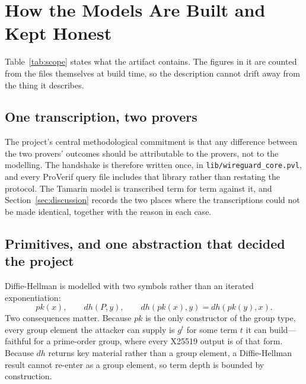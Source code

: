 \section{How the Models Are Built and Kept Honest}
\label{sec:modelling}

Table~\ref{tab:scope} states what the artifact contains. The figures in it are
counted from the files themselves at build time, so the description cannot
drift away from the thing it describes.

\begin{table}[t]
\centering
\caption{Verification scope, measured from the repository rather than
described. ``Properties'' counts rows of the result matrix
(Table~\ref{tab:results}), not queries: a model file may carry several.}
\label{tab:scope}
\footnotesize

\end{table}

\subsection{One transcription, two provers}

The project's central methodological commitment is that any difference between
the two provers' outcomes should be attributable to the provers, not to the
modelling. The handshake is therefore written once, in
\texttt{lib/wireguard\_core.pvl}, and every ProVerif query file includes that
library rather than restating the protocol. The Tamarin model is transcribed
term for term against it, and Section~\ref{sec:discussion} records the two
places where the transcriptions could not be made identical, together with the
reason in each case.

\subsection{Primitives, and one abstraction that decided the project}

 Diffie-Hellman is modelled with two
symbols rather than an iterated exponentiation:
\[
  \mathit{pk}(x), \qquad
  \mathit{dh}(P,y), \qquad
  \mathit{dh}(\mathit{pk}(x),y)=\mathit{dh}(\mathit{pk}(y),x).
\]
Two consequences matter. Because \(\mathit{pk}\) is the only constructor of
the group type, every group element the attacker can supply is \(g^t\) for
some term \(t\) it can build---faithful for a prime-order group, where every
X25519 output is of that form. Because \(\mathit{dh}\) returns key material
rather than a group element, a Diffie-Hellman result cannot re-enter as a
group element, so term depth is bounded by construction.

